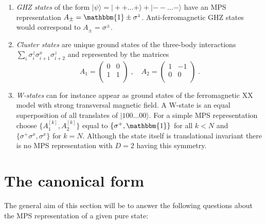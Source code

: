 \documentclass[aps,prl,epsfig,graphics,floatfix,mathbbm,a4paper]{article}
\newcommand{\1}{\mathbbm{1}}
\renewcommand{\>}{\rangle}
\newcommand{\<}{\langle}
\begin{document}
\begin{enumerate}
\begin{equation}
\begin{array}{ccc}
                  1 & 0 & 0 \\
                  0 & 1 & 0 \\
              \end{array}%
              \right)\;.
          \end{equation}
    \item {\it GHZ states} of the form $|\psi\rangle=|++\ldots +\rangle+|--\ldots
              -\rangle$ have an MPS representation $A_\pm=\mathbbm{1}\pm\sigma^z$. Anti-ferromagnetic GHZ states would correspond to  $A_\pm=\sigma^\pm$.
    \item {\it Cluster states} are unique ground states of the
          three-body interactions $\sum_i
              \sigma^z_i\sigma^x_{i+1}\sigma^z_{i+2}$ and represented by the
          matrices $$ A_1= \left(%
              \begin{array}{cc}
                      0 & 0 \\
                      1 & 1 \\
                  \end{array}%
              \right)\;,\quad A_2=\left(%
              \begin{array}{cc}
                      1 & -1 \\
                      0 & 0  \\
                  \end{array}%
              \right)\;.$$
    \item {\it W-states} can for instance appear as ground states of the ferromagnetic
          XX model with strong transversal magnetic field. A W-state is
          an equal superposition of all translates of
          $|100\ldots00\rangle$. For a simple MPS representation choose $\{A_1^{[k]},A_2^{[k]}\}$ equal to $\{\sigma^+,\mathbbm{1}\}$
          for all $k< N$ and $\{\sigma^+\sigma^x,\sigma^x\}$ for $k=N$. Although the state itself is translational invariant
          there is no MPS representation with $D=2$ having this
          symmetry.
\end{enumerate}



\section{The canonical form}\label{Sec:canonical}

The general aim of this section will be to answer the following
questions about the MPS representation of a given pure state:
\end{document}

